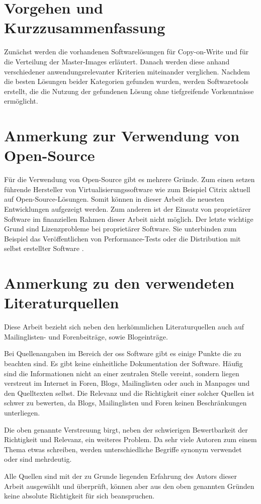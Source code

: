 \section{Vorgehen und Kurzzusammenfassung} 
Zunächst werden die vorhandenen Softwarelösungen für Copy-on-Write und für die Verteilung der Master-Images erläutert. Danach werden diese anhand verschiedener anwendungsrelevanter Kriterien miteinander verglichen. Nachdem die besten Lösungen beider Kategorien gefunden wurden, werden Softwaretools erstellt, die die Nutzung der gefundenen Lösung ohne tiefgreifende Vorkenntnisse ermöglicht.

\section{Anmerkung zur Verwendung von Open-Source}\label{opensource}
Für die Verwendung von Open-Source gibt es mehrere Gründe. Zum einen setzen führende Hersteller von Virtualisierungssoftware wie zum Beispiel Citrix aktuell auf Open-Source-Lösungen. Somit können in dieser Arbeit die neuesten Entwicklungen aufgezeigt werden. Zum anderen ist der Einsatz von proprietärer Software im finanziellen Rahmen dieser Arbeit nicht möglich. Der letzte wichtige Grund sind Lizenzprobleme bei proprietärer Software. Sie unterbinden zum Beispiel das Veröffentlichen von Performance-Tests oder die Distribution mit selbst erstellter Software \cite{vmware}. 

\section{Anmerkung zu den verwendeten Literaturquellen}
Diese Arbeit bezieht sich neben den herkömmlichen Literaturquellen auch auf Mailinglisten- und Forenbeiträge, sowie Blogeinträge.

Bei Quellenangaben im Bereich der \gls{oss} Software gibt es einige Punkte die zu beachten sind. Es gibt keine einheitliche Dokumentation der Software. Häufig sind die Informationen nicht an einer zentralen Stelle vereint, sondern liegen verstreut im Internet in Foren, Blogs, Mailinglisten oder auch in Manpages und den Quelltexten selbst. Die Relevanz und die Richtigkeit einer solcher Quellen ist schwer zu bewerten, da Blogs, Mailinglisten und Foren keinen Beschränkungen unterliegen. \begin{comment} Das heißt, jeder der Willens ist zu einem Thema etwas zu schreiben, kann dies auch tun. \end{comment} 

Die oben genannte Verstreuung birgt, neben der schwierigen Bewertbarkeit der Richtigkeit und Relevanz, ein weiteres Problem. Da sehr viele Autoren zum einem Thema etwas schreiben, werden unterschiedliche Begriffe synonym verwendet oder sind mehrdeutig.

Alle Quellen sind mit der zu Grunde liegenden Erfahrung des Autors dieser Arbeit ausgewählt und überprüft, können aber aus den oben genannten Gründen keine absolute Richtigkeit für sich beanspruchen.
